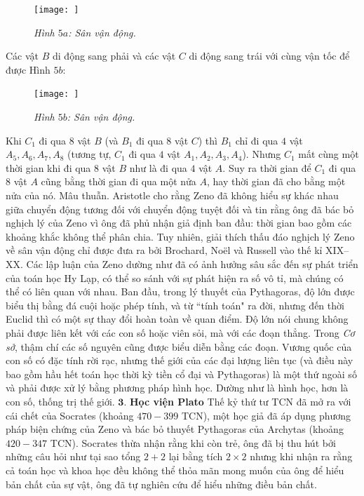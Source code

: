 \begin{multicols}{2}
	\begin{figure}[H]
		\vspace*{-5pt}
		\centering
		\captionsetup{labelformat= empty, justification=centering}
		\texttt{[image: ]}
		\caption{\small\textit{\color{lichsutoanhoc}Hình $5a$: Sân vận động.}}
		\vspace*{-10pt}
	\end{figure}
	Các vật $B$  di động sang phải và các vật $C$ di động sang trái với cùng vận tốc để được Hình $5b$:
	\begin{figure}[H]
		\vspace*{-5pt}
		\centering
		\captionsetup{labelformat= empty, justification=centering}
		\texttt{[image: ]}
		\caption{\small\textit{\color{lichsutoanhoc}Hình $5b$: Sân vận động.}}
		\vspace*{-10pt}
	\end{figure}
	Khi $C_1$  đi qua $8$ vật $B$  (và $B_1$ đi qua 8 vật  $C$) thì $B_1$  chỉ đi qua $4$ vật $A_5, A_6, A_7, A_8$  (tương tự,  $C_1$  đi qua $4$ vật  $A_1, A_2, A_3, A_4$). Nhưng $C_1$  mất cùng một thời gian khi đi qua $8$ vật  $B$ như là đi qua $4$ vật $A$.  Suy ra thời gian để  $C_1$  đi qua $8$ vật $A$  cũng bằng thời gian đi qua một nửa $A$,  hay thời gian đã cho bằng một nửa của nó. Mâu thuẫn.     
	\vskip 0.1cm
	Aristotle cho rằng Zeno đã không hiểu sự khác nhau giữa chuyển động tương đối với chuyển động tuyệt đối và tin rằng ông đã bác bỏ nghịch lý của Zeno vì ông đã phủ nhận giả định ban đầu: thời gian bao gồm các khoảng khắc không thể phân chia. Tuy nhiên, giải thích thấu đáo nghịch lý Zeno về sân vận động chỉ được đưa ra bởi Brochard, Noël và Russell vào thế kỉ XIX--XX.
	\vskip 0.1cm 
	Các lập luận của Zeno dường như đã có ảnh hưởng sâu sắc đến sự phát triển của toán học Hy Lạp, có thể so sánh với sự phát hiện ra số vô tỉ, mà chúng có thể có liên quan với nhau. Ban đầu, trong lý thuyết của Pythagoras, độ lớn được biểu thị bằng đá cuội hoặc phép tính, và từ ``tính toán" ra đời, nhưng đến thời Euclid thì có một sự thay đổi hoàn toàn về quan điểm.  Độ lớn nói chung không phải được liên kết với các con số hoặc viên sỏi, mà với các đoạn thẳng. Trong \textit{Cơ sở}, thậm chí các số nguyên cũng được biểu diễn bằng các đoạn. Vương quốc của con số có đặc tính rời rạc, nhưng thế giới của các đại lượng liên tục (và điều này bao gồm hầu hết toán học thời kỳ tiền cổ đại và Pythagoras) là một thứ ngoài số và phải được xử lý bằng phương pháp hình học.  Dường như là hình học, hơn là con số, thống trị thế giới.
	\vskip 0.1cm
	$\pmb{3.}$ \textbf{Học viện Plato}
	\vskip 0.1cm
	Thế kỷ thứ tư TCN đã mở ra với cái chết của Socrates (khoảng $470-399$ TCN), một học giả đã áp dụng phương pháp biện chứng của Zeno và bác bỏ thuyết Pythagoras của Archytas (khoảng $420-347$ TCN). Socrates thừa nhận rằng khi còn trẻ, ông đã bị thu hút bởi những câu hỏi như tại sao tổng $2 + 2$ lại bằng tích $2 \times 2$  nhưng khi nhận ra rằng cả toán học và khoa học đều không thể thỏa mãn mong muốn của ông để  hiểu bản chất của sự vật, ông đã tự nghiên cứu để hiểu những điều bản chất.

\end{multicols}
